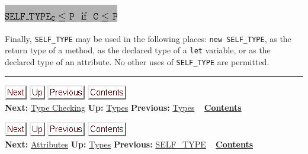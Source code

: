 \documentclass[]{article}
\begin{document}
\includegraphics{img12.png}

Finally, \texttt{SELF\_TYPE} may be used in the following places:
\texttt{new SELF\_TYPE}, as the return type of a method, as the declared
type of a \texttt{let} variable, or as the declared type of an
attribute. No other uses of \texttt{SELF\_TYPE} are permitted.

\begin{center}\rule{3in}{0.4pt}\end{center}

\href{node9.html}{\includegraphics{next.png}}
\href{node7.html}{\includegraphics{up.png}}
\href{node7.html}{\includegraphics{prev.png}}
\href{node1.html}{\includegraphics{contents.png}} \\ \textbf{Next:}
\href{node9.html}{Type Checking} \textbf{Up:} \href{node7.html}{Types}
\textbf{Previous:} \href{node7.html}{Types} ~
\textbf{\href{node1.html}{Contents}}

\href{node10.html}{\includegraphics{next.png}}
\href{node7.html}{\includegraphics{up.png}}
\href{node8.html}{\includegraphics{prev.png}}
\href{node1.html}{\includegraphics{contents.png}} \\ \textbf{Next:}
\href{node10.html}{Attributes} \textbf{Up:} \href{node7.html}{Types}
\textbf{Previous:} \href{node8.html}{SELF\_TYPE} ~
\textbf{\href{node1.html}{Contents}} \\ \\
\end{document}
